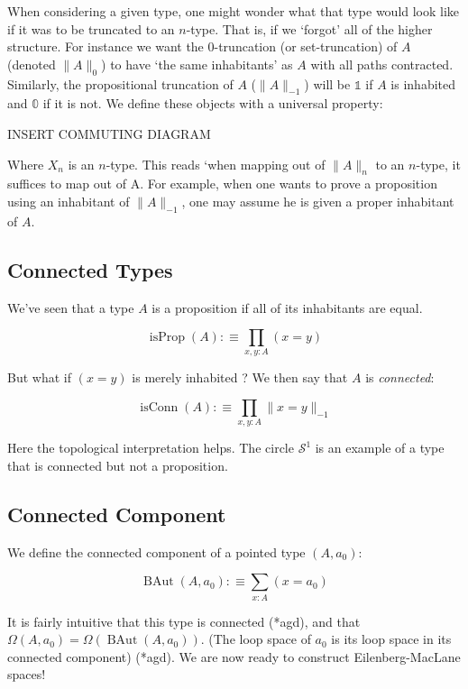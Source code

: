 \documentclass{article}
\DeclareMathOperator{\isprop}{isProp}
\DeclareMathOperator{\isconn}{isConn}
\DeclareMathOperator{\baut}{BAut}
\begin{document}
When considering a given type, one might wonder what that type would look like if it was to be truncated to an $n$-type. That is, if we `forgot' all of the higher structure. For instance we want the $0$-truncation (or set-truncation) of $A$ (denoted $\|A\|_{0}$) to have `the same inhabitants' as $A$ with all paths contracted. Similarly, the propositional truncation of $A$ ($\|A\|_{-1}$) will be $\mathbb{1}$ if $A$ is inhabited and $\mathbb{0}$ if it is not. We define these objects with a universal property:

INSERT COMMUTING DIAGRAM

Where $X_{n}$ is an $n$-type. This reads `when mapping out of $\|A\|_{n}$ to an $n$-type, it suffices to map out of A. For example, when one wants to prove a proposition using an inhabitant of $\|A\|_{-1}$, one may assume he is given a proper inhabitant of $A$.

\subsection{Connected Types}

We've seen that a type $A$ is a proposition if all of its inhabitants are equal.

\[\isprop(A) :\equiv \prod_{x,y : A} (x = y)\]

But what if $(x = y)$ is merely inhabited ? We then say that $A$ is \emph{connected}:

\[\isconn(A) :\equiv \prod_{x,y : A} \|x = y \|_{-1}\]

Here the topological interpretation helps. The circle $\mathcal{S}^{1}$ is an example of a type that is connected but not a proposition.

\subsection{Connected Component}

We define the connected component of a pointed type $(A,a_0)$:

\[\baut(A,a_0) :\equiv \sum_{x : A} (x = a_0)\]

It is fairly intuitive that this type is connected (*agd), and that $\Omega(A,a_0) = \Omega(\baut(A,a_0))$. (The loop space of $a_0$ is its loop space in its connected component) (*agd). We are now ready to construct Eilenberg-MacLane spaces!
\end{document}
